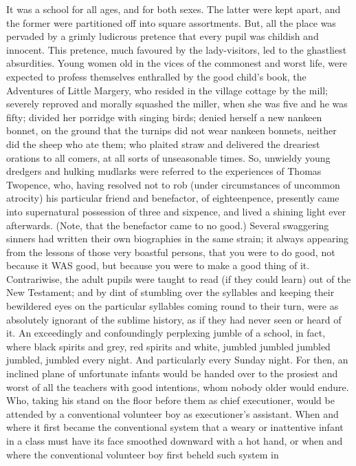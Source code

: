 It was a school for all ages, and for both sexes. The latter were kept
apart, and the former were partitioned off into square assortments. But,
all the place was pervaded by a grimly ludicrous pretence that every
pupil was childish and innocent. This pretence, much favoured by the
lady-visitors, led to the ghastliest absurdities. Young women old in
the vices of the commonest and worst life, were expected to profess
themselves enthralled by the good child’s book, the Adventures of
Little Margery, who resided in the village cottage by the mill; severely
reproved and morally squashed the miller, when she was five and he was
fifty; divided her porridge with singing birds; denied herself a new
nankeen bonnet, on the ground that the turnips did not wear nankeen
bonnets, neither did the sheep who ate them; who plaited straw and
delivered the dreariest orations to all comers, at all sorts of
unseasonable times. So, unwieldy young dredgers and hulking mudlarks
were referred to the experiences of Thomas Twopence, who, having
resolved not to rob (under circumstances of uncommon atrocity) his
particular friend and benefactor, of eighteenpence, presently came into
supernatural possession of three and sixpence, and lived a shining light
ever afterwards. (Note, that the benefactor came to no good.) Several
swaggering sinners had written their own biographies in the same strain;
it always appearing from the lessons of those very boastful persons,
that you were to do good, not because it WAS good, but because you were
to make a good thing of it. Contrariwise, the adult pupils were taught
to read (if they could learn) out of the New Testament; and by dint of
stumbling over the syllables and keeping their bewildered eyes on the
particular syllables coming round to their turn, were as absolutely
ignorant of the sublime history, as if they had never seen or heard of
it. An exceedingly and confoundingly perplexing jumble of a school,
in fact, where black spirits and grey, red spirits and white, jumbled
jumbled jumbled jumbled, jumbled every night. And particularly every
Sunday night. For then, an inclined plane of unfortunate infants would
be handed over to the prosiest and worst of all the teachers with good
intentions, whom nobody older would endure. Who, taking his stand on
the floor before them as chief executioner, would be attended by a
conventional volunteer boy as executioner’s assistant. When and where it
first became the conventional system that a weary or inattentive infant
in a class must have its face smoothed downward with a hot hand, or when
and where the conventional volunteer boy first beheld such system in
